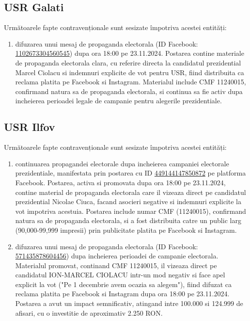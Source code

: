 \documentclass[a4paper,12pt]{article}
\begin{document}
\vspace{0.5cm}

\subsection{USR Galati}
Următoarele fapte contravenționale sunt sesizate împotriva acestei entități:

\begin{enumerate}[leftmargin=*, label=\arabic*.)]
    \item difuzarea unui mesaj de propaganda electorala (ID Facebook: \href{https://www.facebook.com/ads/library/?id=1102673304560545}{1102673304560545}) dupa ora 18:00 pe 23.11.2024. Postarea contine materiale de propaganda electorala clara, cu referire directa la candidatul prezidential Marcel Ciolacu si indemnuri explicite de vot pentru USR, fiind distribuita ca reclama platita pe Facebook si Instagram. Materialul include CMF 11240015, confirmand natura sa de propaganda electorala, si continua sa fie activ dupa incheierea perioadei legale de campanie pentru alegerile prezidentiale.
\end{enumerate}

\vspace{0.5cm}

\subsection{USR Ilfov}
Următoarele fapte contravenționale sunt sesizate împotriva acestei entități:

\begin{enumerate}[leftmargin=*, label=\arabic*.)]
    \item continuarea propagandei electorale dupa incheierea campaniei electorale prezidentiale, manifestata prin postarea cu ID \href{https://www.facebook.com/ads/library/?id=449144147850872}{449144147850872} pe platforma Facebook. Postarea, activa si promovata dupa ora 18:00 pe 23.11.2024, contine material de propaganda electorala care il vizeaza direct pe candidatul prezidential Nicolae Ciuca, facand asocieri negative si indemnuri explicite la vot impotriva acestuia. Postarea include numar CMF (11240015), confirmand natura sa de propaganda electorala, si a fost distribuita catre un public larg (90,000-99,999 impresii) prin publicitate platita pe Facebook si Instagram.
    \item difuzarea unui mesaj de propaganda electorala (ID Facebook: \href{https://www.facebook.com/ads/library/?id=571435878604456}{571435878604456}) dupa incheierea perioadei de campanie electorala. Materialul promovat, continand CMF 11240015, il vizeaza direct pe candidatul ION-MARCEL CIOLACU intr-un mod negativ si face apel explicit la vot ("Pe 1 decembrie avem ocazia sa alegem"), fiind difuzat ca reclama platita pe Facebook si Instagram dupa ora 18:00 pe 23.11.2024. Postarea a avut un impact semnificativ, atingand intre 100.000 si 124.999 de afisari, cu o investitie de aproximativ 2.250 RON.
\end{enumerate}
\end{document}
